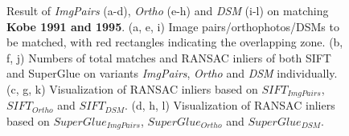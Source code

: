 \begin{figure}[htbp]
\begin{center}
{\begin{minipage}[t]{0.48\linewidth}
			\end{minipage}%
		}
		\caption{{ Result of \textit{ImgPairs} (a-d), \textit{Ortho} (e-h) and \textit{DSM} (i-l) on matching \textbf{Kobe 1991 and 1995}. (a, e, i) Image pairs/orthophotos/DSMs to be matched, with red rectangles indicating the overlapping zone. (b, f, j) Numbers of total matches and RANSAC inliers of both SIFT and SuperGlue on variants \textit{ImgPairs}, \textit{Ortho} and \textit{DSM} individually. (c, g, k) Visualization of RANSAC inliers based on $SIFT_{ImgPairs}$, $SIFT_{Ortho}$ and $SIFT_{DSM}$. (d, h, l) Visualization of RANSAC inliers based on $SuperGlue_{ImgPairs}$, $SuperGlue_{Ortho}$ and $SuperGlue_{DSM}$.}}        

\end{center}
\end{figure}
